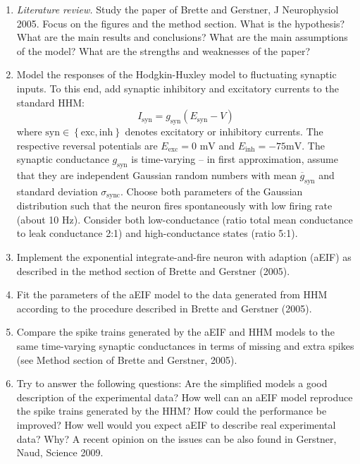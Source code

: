 \documentclass[12pt]{article}
\begin{document}
\begin{enumerate}
    \item \textit{Literature review.} Study the paper of Brette and
        Gerstner,  J Neurophysiol 2005. Focus on the figures and  the method
        section. What is the hypothesis? What are the main results
        and conclusions? What are the main assumptions of the model?
        What are the strengths and weaknesses of the paper?

    \item Model the responses of the Hodgkin-Huxley model to fluctuating
        synaptic inputs. To this end, add synaptic
        inhibitory and excitatory currents to the standard HHM:
        \begin{equation}
            I_\mathrm{syn}=g_\mathrm{syn}(E_\mathrm{syn}-V)
            \label{eq:syn_current}
        \end{equation}
        where $\mathrm{syn} \in  \left\{\mathrm{exc},
        \mathrm{inh}\right\}$ denotes excitatory or inhibitory
        currents. The respective reversal potentials are
        $E_\mathrm{exc}=0\text{ mV}$ and $E_\mathrm{inh}=-75\text{
        mV}$. The synaptic conductance $g_\mathrm{syn}$ is
        time-varying --  in first approximation, assume that
        they are independent Gaussian random numbers with mean
        $\overline{g}_\mathrm{syn}$ and standard deviation
        $\sigma_\mathrm{sync}$. Choose both parameters of the
        Gaussian distribution such that the neuron fires spontaneously
        with low firing rate (about 10 Hz). Consider both
        low-conductance (ratio total mean conductance to leak conductance
        2:1) and high-conductance states (ratio 5:1).

    \item Implement the exponential integrate-and-fire neuron with
        adaption (aEIF) as described in the method section of
        Brette and Gerstner (2005).

    \item Fit the parameters of the aEIF model to the data generated from
        HHM according to the procedure described in Brette and
        Gerstner (2005).

    \item Compare the spike trains generated by the aEIF and HHM models
        to the same time-varying synaptic conductances in terms of
        missing and extra spikes (see Method section of Brette and
        Gerstner, 2005).

    \item Try to answer the following questions: Are the simplified
        models a good description of the experimental data? How well
        can an aEIF  model reproduce the spike  trains generated by the HHM?
        How could the performance be improved? How well would you expect
        aEIF to describe real experimental data? Why?  A recent
        opinion on the issues can be also found in Gerstner, Naud,
        Science 2009.

\end{enumerate}
\end{document}
